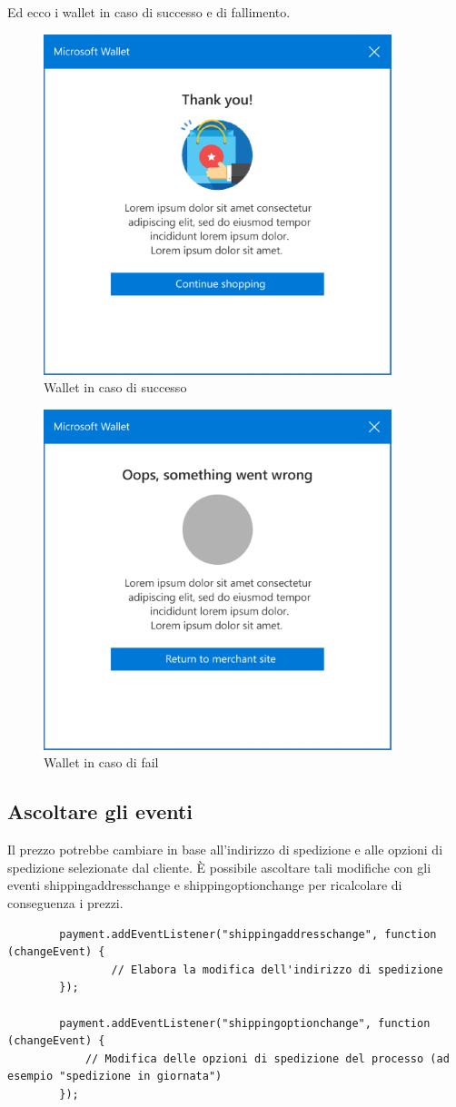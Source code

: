 \documentclass[11pt ,a4paper , twoside , openright ]{article}
\begin{document}
	Ed ecco i wallet in caso di successo e di fallimento.
	\begin{figure}[h]
		\centering
		\includegraphics[width=0.5\linewidth]{wallet2}
		\caption{Wallet in caso di successo}
		\label{fig: Wallet in caso di successo}
	\end{figure}
	\begin{figure}[h]
		\centering
		\includegraphics[width=0.5\linewidth]{wallet3}
		\caption{Wallet in caso di fail}
		\label{fig: Wallet in caso di fail}
	\end{figure}
	\pagebreak	
	\subsection{Ascoltare gli eventi}
	Il prezzo potrebbe cambiare in base all'indirizzo di spedizione e alle opzioni di spedizione selezionate dal cliente. È possibile ascoltare tali modifiche con gli eventi shippingaddresschange e shippingoptionchange per ricalcolare di conseguenza i prezzi.
	\begin{lstlisting}
		payment.addEventListener("shippingaddresschange", function (changeEvent) {
			    // Elabora la modifica dell'indirizzo di spedizione
		});
		
		payment.addEventListener("shippingoptionchange", function (changeEvent) {
			// Modifica delle opzioni di spedizione del processo (ad esempio "spedizione in giornata")
		});
	\end{lstlisting}
	\newpage
\end{document}
